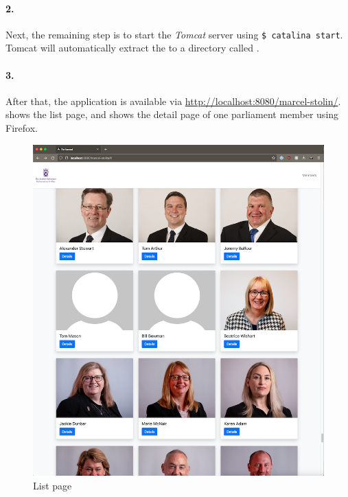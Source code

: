 \paragraph{2.}
Next, the remaining step is to start the \textit{Tomcat} server using \texttt{\$ catalina start}. Tomcat will automatically extract the  to a directory called .

\paragraph{3.}
After that, the application is available via \url{http://localhost:8080/marcel-stolin/}.  shows the list page, and  shows the detail page of one parliament member using Firefox.

\newpage

\begin{figure}[h]
\centering
\includegraphics[scale=1]{images/03_depl/member-list}
\caption{List page}
\label{fig:subsubsec:03_depl_list}
\end{figure}

\newpage

